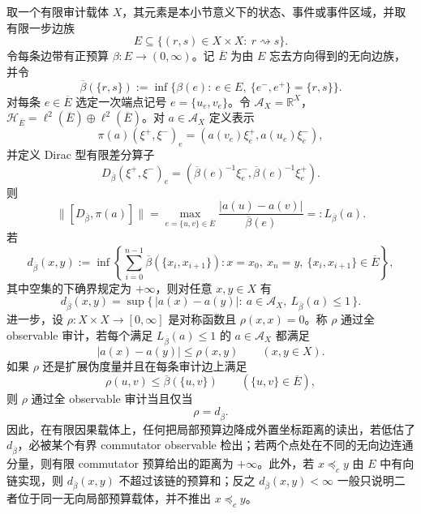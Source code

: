 \begin{theorem}\label{distill:connes_spectral_triples_and_chamseddine_connes_spectral_action-metric_from_commutator_family-causal-edge-budget-distance-duality}
取一个有限审计载体 \(X\)，其元素是本小节意义下的状态、事件或事件区域，并取有限一步边族
\[
E\subseteq \{(r,s)\in X\times X:\ r\rightsquigarrow s\}.
\]
令每条边带有正预算 \(\beta:E\to(0,\infty)\)。记 \(\overline E\) 为由 \(E\) 忘去方向得到的无向边族，并令
\[
\overline\beta(\{r,s\})
:=
\inf\{\beta(e):\ e\in E,\ \{e^-,e^+\}=\{r,s\}\}.
\]
对每条 \(e\in\overline E\) 选定一次端点记号 \(e=\{u_e,v_e\}\)。令 \(\mathcal A_X=\mathbb R^X\)，\(\mathcal H_{\overline E}=\ell^2(\overline E)\oplus\ell^2(\overline E)\)。对 \(a\in\mathcal A_X\) 定义表示
\[
\pi(a)(\xi^+,\xi^-)_e=(a(v_e)\xi^+_e,a(u_e)\xi^-_e),
\]
并定义 Dirac 型有限差分算子
\[
D_{\overline\beta}(\xi^+,\xi^-)_e
=
(\overline\beta(e)^{-1}\xi^-_e,\overline\beta(e)^{-1}\xi^+_e).
\]
则
\[
\bigl\|[D_{\overline\beta},\pi(a)]\bigr\|
=
\max_{e=\{u,v\}\in\overline E}
\frac{|a(u)-a(v)|}{\overline\beta(e)}
=:L_{\overline\beta}(a).
\]
若
\[
d_{\overline\beta}(x,y)
:=
\inf\left\{\sum_{i=0}^{n-1}\overline\beta(\{x_i,x_{i+1}\}):
 x=x_0,\ x_n=y,\ \{x_i,x_{i+1}\}\in\overline E\right\},
\]
其中空集的下确界规定为 \(+\infty\)，则对任意 \(x,y\in X\) 有
\[
d_{\overline\beta}(x,y)
=
\sup\{\,|a(x)-a(y)|:\ a\in\mathcal A_X,\ L_{\overline\beta}(a)\le 1\,\}.
\]
进一步，设 \(\rho:X\times X\to[0,\infty]\) 是对称函数且 \(\rho(x,x)=0\)。称 \(\rho\) 通过全 observable 审计，若每个满足 \(L_{\overline\beta}(a)\le1\) 的 \(a\in\mathcal A_X\) 都满足
\[
|a(x)-a(y)|\le \rho(x,y)
\qquad(x,y\in X).
\]
如果 \(\rho\) 还是扩展伪度量并且在每条审计边上满足
\[
\rho(u,v)\le \overline\beta(\{u,v\})
\qquad(\{u,v\}\in\overline E),
\]
则 \(\rho\) 通过全 observable 审计当且仅当
\[
\rho=d_{\overline\beta}.
\]
因此，在有限因果载体上，任何把局部预算边降成外置坐标距离的读出，若低估了 \(d_{\overline\beta}\)，必被某个有界 commutator observable 检出；若两个点处在不同的无向边连通分量，则有限 commutator 预算给出的距离为 \(+\infty\)。此外，若 \(x\preceq_c y\) 由 \(E\) 中有向链实现，则 \(d_{\overline\beta}(x,y)\) 不超过该链的预算和；反之 \(d_{\overline\beta}(x,y)<\infty\) 一般只说明二者位于同一无向局部预算载体，并不推出 \(x\preceq_c y\)。
\end{theorem}
